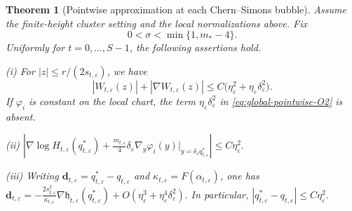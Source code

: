 \documentclass[10pt,a4paper]{amsart}
\numberwithin{equation}{section}
\newtheorem{theorem}{Theorem}[section]
\theoremstyle{definition}
\theoremstyle{remark}
\newcommand{\eps}{\varepsilon}
\newcommand{\etae}{\eta_{\eps}}
\newcommand{\de}{\delta_{\eps}}
\begin{document}
\setcounter{section}{5}
\setcounter{equation}{0}
\setcounter{theorem}{0}
\begin{theorem}[Pointwise approximation at each Chern--Simons bubble]
\label{prop:refined-profile}
Assume the finite-height cluster setting and the local normalizations above.
Fix
\begin{equation}
  0<\sigma<\min\{1,m_*-4\}.
  \label{eq:sigma-choice}
\end{equation}
Uniformly for $t=0,\dots,S-1$, the following assertions hold.

\smallskip
\noindent\textup{(i)}   
For $|z|\le r/(2s_{t,\eps})$, we have
\begin{equation}\label{eq:global-pointwise-O2}
 |W_{t,\eps}(z)|+|\nabla W_{t,\eps}(z)|
 \le C\bigl(\etae^2+\etae\de^2\bigr).
\end{equation}
If $\varphi_i$ is constant on the local chart, the term
$\etae\de^2$ in \eqref{eq:global-pointwise-O2} is absent.

\smallskip
\noindent\textup{(ii)} \(
  \left|
  \nabla\log H_{t,\eps}(q_{t,\eps}^*)
  +\frac{m_{t,\eps}}4
   \de\nabla_y\varphi_i(y)\Big|_{y=\de q_{t,\eps}^*}
  \right|
  \le C\etae^2.
\)

\smallskip
\noindent\textup{(iii)}
Writing
$\mathbf{d}_{t,\eps}=q_{t,\eps}^*-q_{t,\eps}$ and
$\kappa_{t,\eps}=F(\alpha_{t,\eps})$, one has
\(
  \mathbf{d}_{t,\eps}
  =-\frac{2s_{t,\eps}^2}{\kappa_{t,\eps}}
  \nabla\mathfrak h_{t,\eps}(q_{t,\eps}^*)
  +O(\etae^3+\etae^4\de^2).
  \)
In particular, $|q_{t,\eps}^*-q_{t,\eps}|\le C\etae^2$.


\end{theorem}
\end{document}

